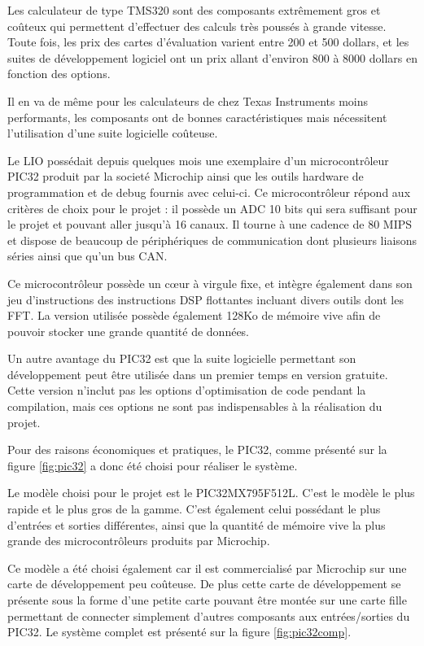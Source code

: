 \documentclass[letterpaper, twoside, 12pt, memoire, creativecommons, hyperref]{thETS}
\begin{document}
Les calculateur de type TMS320 sont des composants extrêmement gros et coûteux qui permettent d'effectuer des calculs très poussés à grande vitesse.  Toute fois, les prix des cartes d'évaluation varient entre 200 et 500 dollars, et les suites de développement logiciel ont un prix allant d'environ 800 à 8000 dollars en fonction des options. 

Il en va de même pour les calculateurs de chez Texas Instruments moins performants, les composants ont de bonnes caractéristiques mais nécessitent l'utilisation d'une suite logicielle coûteuse. 

Le LIO possédait depuis quelques mois une exemplaire d'un microcontrôleur PIC32 produit par la societé Microchip ainsi que les outils hardware de programmation et de debug fournis avec celui-ci. Ce microcontrôleur répond aux critères de choix pour le projet : il possède un ADC 10 bits qui sera suffisant pour le projet et pouvant aller jusqu’à 16 canaux. Il tourne à une cadence de 80 MIPS et dispose de beaucoup de périphériques de communication dont plusieurs liaisons séries ainsi que qu’un bus CAN. 

Ce microcontrôleur possède un cœur à virgule fixe, et intègre également dans son jeu d'instructions des instructions DSP flottantes incluant divers outils dont les FFT. La version utilisée possède également 128Ko de mémoire vive afin de pouvoir stocker une grande quantité de données.

Un autre avantage du PIC32 est que la suite logicielle permettant son développement peut être utilisée dans un premier temps en version gratuite. Cette version n'inclut pas les options d'optimisation de code pendant la compilation, mais ces options ne sont pas indispensables à la réalisation du projet. 

Pour des raisons économiques et pratiques, le PIC32, comme présenté sur la figure \ref{fig:pic32} %
 a donc été choisi pour réaliser le système.
 
Le modèle choisi pour le projet est le PIC32MX795F512L. C'est le modèle le plus rapide et le plus gros de la gamme. C'est également celui possédant le plus d'entrées et sorties différentes, ainsi que la quantité de mémoire vive la plus grande des microcontrôleurs produits par Microchip.

Ce modèle a été choisi également car il est commercialisé par Microchip sur une carte de développement peu coûteuse. De plus cette carte de développement se présente sous la forme d'une petite carte pouvant être montée sur une carte fille permettant de connecter simplement d'autres composants aux entrées/sorties du PIC32. Le système complet est présenté sur la figure \ref{fig:pic32comp}.
\end{document}
